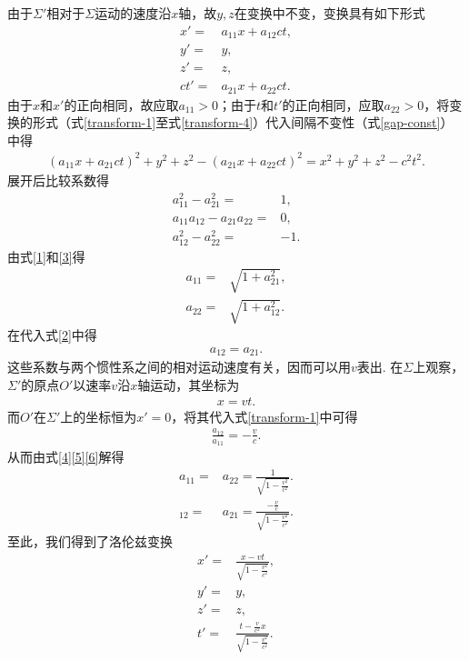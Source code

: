\documentclass{assignment}
\begin{document}
由于$\Sigma'$相对于$\Sigma$运动的速度沿$x$轴，故$y,z$在变换中不变，变换具有如下形式
\begin{align}
    \label{transform-1}x'=&a_{11}x+a_{12}ct,\\
    y'=&y,\\
    z'=&z,\\
    \label{transform-4}ct'=&a_{21}x+a_{22}ct.
\end{align}
由于$x$和$x'$的正向相同，故应取$a_{11}>0$；由于$t$和$t'$的正向相同，应取$a_{22}>0$，将变换的形式（式\eqref{transform-1}至式\eqref{transform-4}）代入间隔不变性（式\eqref{gap-const}）中得
\begin{align}
    (a_{11}x+a_{21}ct)^2+y^2+z^2-(a_{21}x+a_{22}ct)^2=x^2+y^2+z^2-c^2t^2.
\end{align}
展开后比较系数得
\begin{align}
    \label{1}a_{11}^2-a_{21}^2=&1,\\
    \label{2}a_{11}a_{12}-a_{21}a_{22}=&0,\\
    \label{3}a_{12}^2-a_{22}^2=&-1.
\end{align}
由式\eqref{1}和\eqref{3}得
\begin{align}
    \label{4}a_{11}=&\sqrt{1+a_{21}^2},\\
    \label{5}a_{22}=&\sqrt{1+a_{12}^2}.
\end{align}
在代入式\eqref{2}中得
\begin{align}
    \label{6}a_{12}=a_{21}.
\end{align}
这些系数与两个惯性系之间的相对运动速度有关，因而可以用$v$表出. 在$\Sigma$上观察，$\Sigma'$的原点$O'$以速率$v$沿$x$轴运动，其坐标为
\begin{align}
    x=vt.
\end{align}
而$O'$在$\Sigma'$上的坐标恒为$x'=0$，将其代入式\eqref{transform-1}中可得
\begin{align}
    \frac{a_{12}}{a_{11}}=-\frac{v}{c}.
\end{align}
从而由式\eqref{4}\eqref{5}\eqref{6}解得
\begin{align}
    a_{11}=&a_{22}=\frac{1}{\sqrt{1-\frac{v^2}{c^2}}}.\\
    _{12}=&a_{21}=\frac{-\frac{v}{c}}{\sqrt{1-\frac{v^2}{c^2}}}.
\end{align}
至此，我们得到了洛伦兹变换
\begin{align}
    x'=&\frac{x-vt}{\sqrt{1-\frac{v^2}{c^2}}},\\
    y'=&y,\\
    z'=&z,\\
    t'=&\frac{t-\frac{v}{c^2}x}{\sqrt{1-\frac{v^2}{c^2}}}.
\end{align}
\end{document}
